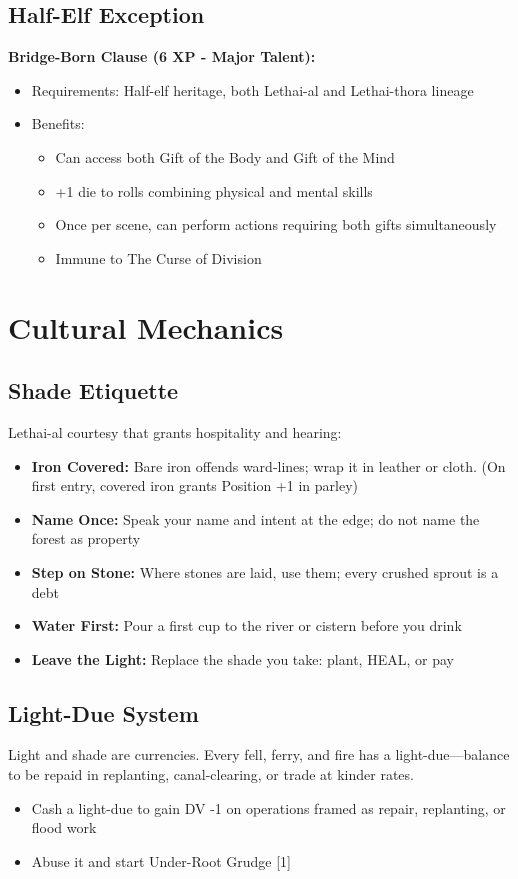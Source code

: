\documentclass[11pt]{article}
\newcommand{\talent}[1]{\textbf{#1}}
\begin{document}
\subsection*{Half-Elf Exception}
\talent{Bridge-Born Clause (6 XP - Major Talent):}
\begin{itemize}
  \item Requirements: Half-elf heritage, both Lethai-al and Lethai-thora lineage
  \item Benefits:
    \begin{itemize}
      \item Can access both Gift of the Body and Gift of the Mind
      \item +1 die to rolls combining physical and mental skills
      \item Once per scene, can perform actions requiring both gifts simultaneously
      \item Immune to The Curse of Division
    \end{itemize}
\end{itemize}

\section*{Cultural Mechanics}

\subsection*{Shade Etiquette}
Lethai-al courtesy that grants hospitality and hearing:
\begin{itemize}
  \item \textbf{Iron Covered:} Bare iron offends ward-lines; wrap it in leather or cloth. (On first entry, covered iron grants Position +1 in parley)
  \item \textbf{Name Once:} Speak your name and intent at the edge; do not name the forest as property
  \item \textbf{Step on Stone:} Where stones are laid, use them; every crushed sprout is a debt
  \item \textbf{Water First:} Pour a first cup to the river or cistern before you drink
  \item \textbf{Leave the Light:} Replace the shade you take: plant, HEAL, or pay
\end{itemize}

\subsection*{Light-Due System}
Light and shade are currencies. Every fell, ferry, and fire has a light-due---balance to be repaid in replanting, canal-clearing, or trade at kinder rates.
\begin{itemize}
  \item Cash a light-due to gain DV -1 on operations framed as repair, replanting, or flood work
  \item Abuse it and start Under-Root Grudge [1]
\end{itemize}
\end{document}

